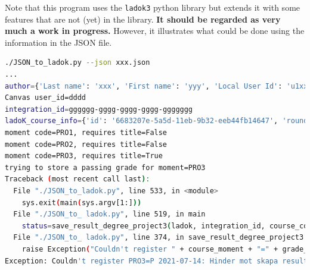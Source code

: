 Note that this program uses the \texttt{ladok3} python library but extends it with some features that are not (yet) in the library. \textbf{It should be regarded as very much a work in progress.} However, it illustrates what could be done using the information in the JSON file.
\begin{lstlisting}[language={bash},
    breaklines=true,
    breakatwhitespace=true,          % sets if automatic breaks should only happen at whitespace
    breakindent=0em,
    caption={Using the extracted JSON to produce a LADOK entry for a student in the DA231X degree project course}, label=lst:usingExtractedJSONtoProduceLADOKentry1]
./JSON_to_ladok.py --json xxx.json 
...
author={'Last name': 'xxx', 'First name': 'yyy', 'Local User Id': 'u1xxxx', 'E-mail': 'oxxx@kth.se', 'organisation': {'L1': 'School of Electrical Engineering and Computer Science '}}
Canvas user_id=dddd
integration_id=gggggg-gggg-gggg-gggg-ggggggg
ladoK_course_info={'id': '6683207e-5a5d-11eb-9b32-eeb44fb14647', 'round_id': '8e15ae14-1d86-11ea-a622-3565135944de', 'education_id': '374ea085-73d8-11e8-afa7-8e408e694e54', 'instance_id': '8eee8da9-dd0a-11e8-bb7a-19f8cd1a470e', 'swe_name': 'Examensarbete i datalogi och datateknik, avancerad nivå', 'eng_name': 'Degree Project in Computer Science and Engineering, Second Cycle'}
moment code=PRO1, requires title=False
moment code=PRO2, requires title=False
moment code=PRO3, requires title=True
trying to store a passing grade for moment=PRO3
Traceback (most recent call last):
  File "./JSON_to_ladok.py", line 533, in <module>
    sys.exit(main(sys.argv[1:]))
  File "./JSON_to_ ladok.py", line 519, in main
    status=save_result_degree_project3(ladok, integration_id, course_code, mom['Utbildningskod'], '2021-07-14', 'P', "PF", main_title, alternative_main_title)
  File "./JSON_to_ ladok.py", line 374, in save_result_degree_project3
    raise Exception("Couldn't register " + course_moment + "=" + grade_raw + " " + result_date_raw + ": " + r.json()["Meddelande"])
Exception: Couldn't register PRO3=P 2021-07-14: Hinder mot skapa resultat påträffat: Rapporteringsrättighet saknas
\end{lstlisting}


